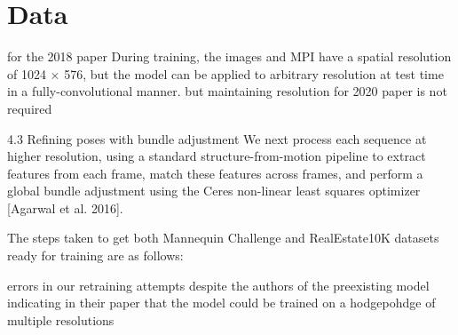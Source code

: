 \section{Data}\label{sec2:data} 

for the 2018 paper
During training, the images and
MPI have a spatial resolution of 1024 × 576, but the model can be
applied to arbitrary resolution at test time in a fully-convolutional
manner.
but maintaining resolution for 2020 paper is not required 

4.3 Refining poses with bundle adjustment
We next process each sequence at higher resolution, using a standard
structure-from-motion pipeline to extract features from each
frame, match these features across frames, and perform a global
bundle adjustment using the Ceres non-linear least squares optimizer
[Agarwal et al. 2016].


The steps taken to get both Mannequin Challenge and RealEstate10K datasets ready for training are as follows:


errors in our retraining attempts despite the authors of the preexisting model indicating in their paper that the model could be trained on a hodgepohdge of multiple resolutions   


